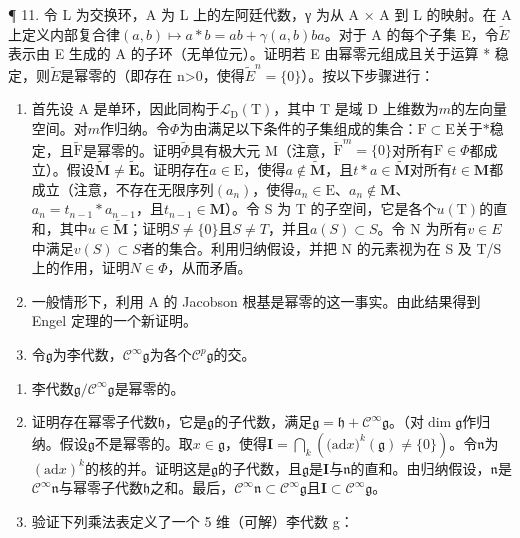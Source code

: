 ¶ 11. 令 L 为交换环，A 为 L 上的左阿廷代数，γ 为从 A × A 到 L 的映射。在 A 上定义内部复合律\((a, b) \mapsto a * b = ab + \gamma(a, b)ba\)。对于 A 的每个子集 E，令\(\tilde{E}\)表示由 E 生成的 A 的子环（无单位元）。证明若 E 由幂零元组成且关于运算 * 稳定，则\(\tilde{E}\)是幂零的（即存在 n\textgreater{}0，使得\(\tilde{E}^{n} = \{0\}\)）。按以下步骤进行：

\begin{enumerate}
\def\labelenumi{\arabic{enumi}.}
\item
  首先设 A 是单环，因此同构于\(\mathcal{L}_{\mathrm{D}}(\mathrm{T})\)，其中 T 是域 D 上维数为\(m\)的左向量空间。对\(m\)作归纳。令\(\Phi\)为由满足以下条件的子集组成的集合：\(\mathrm{F} \subset \mathrm{E}\)关于\(*\)稳定，且\(\tilde{\mathrm{F}}\)是幂零的。证明\(\tilde{\Phi}\)具有极大元 M（注意，\(\tilde{\mathrm{F}}^m = \{0\}\)对所有\(\mathrm{F} \in \Phi\)都成立）。假设\(\tilde{\mathbf{M}} \neq \tilde{\mathbf{E}}\)。证明存在\(a \in \mathrm{E}\)，使得\(a \notin \tilde{\mathbf{M}}\)，且\(t * a \in \tilde{\mathbf{M}}\)对所有\(t \in \mathbf{M}\)都成立（注意，不存在无限序列\((a_n)\)，使得\(a_n \in \mathrm{E}\)、\(a_n \notin \mathbf{M}\)、\(a_n = t_{n-1} * a_{n-1}\)，且\(t_{n-1} \in \mathbf{M}\)）。令 S 为 T 的子空间，它是各个\(u(\mathrm{T})\)的直和，其中\(u \in \tilde{\mathbf{M}}\)；证明\(S \neq \{0\}\)且\(S \neq T\)，并且\(a(S) \subset S\)。令 N 为所有\(v \in E\)中满足\(v(S) \subset S\)者的集合。利用归纳假设，并把 N 的元素视为在 S 及 T/S 上的作用，证明\(N \in \Phi\)，从而矛盾。
\item
  一般情形下，利用 A 的 Jacobson 根基是幂零的这一事实。由此结果得到 Engel 定理的一个新证明。
\item
  令\(\mathfrak{g}\)为李代数，\(\mathcal{C}^{\infty}\mathfrak{g}\)为各个\(\mathcal{C}^p\mathfrak{g}\)的交。
\end{enumerate}

\begin{enumerate}
\def\labelenumi{(\alph{enumi})}
\item
 李代数\(\mathfrak{g} / \mathcal{C}^{\infty}\mathfrak{g}\)是幂零的。
\item
  证明存在幂零子代数\(\mathfrak{h}\)，它是\(\mathfrak{g}\)的子代数，满足\(\mathfrak{g} = \mathfrak{h} + \mathcal{C}^{\infty}\mathfrak{g}\)。（对\(\dim \mathfrak{g}\)作归纳。假设\(\mathfrak{g}\)不是幂零的。取\(x\in \mathfrak{g}\)，使得\(\mathbf{I} = \bigcap_{k}\left(\mathrm{(ad}x)^{k}(\mathfrak{g})\neq \{0\}\right)\)。令\(\mathfrak{n}\)为\((\mathrm{ad}x)^k\)的核的并。证明这是\(\mathfrak{g}\)的子代数，且\(\mathfrak{g}\)是\(\mathbf{I}\)与\(\mathfrak{n}\)的直和。由归纳假设，\(\mathfrak{n}\)是\(\mathcal{C}^{\infty}\mathfrak{n}\)与幂零子代数\(\mathfrak{h}\)之和。最后，\(\mathcal{C}^{\infty}\mathfrak{n}\subset \mathcal{C}^{\infty}\mathfrak{g}\)且\(\mathbf{I}\subset \mathcal{C}^{\infty}\mathfrak{g}\)。
\item
  验证下列乘法表定义了一个 5 维（可解）李代数 g：
\end{enumerate}

